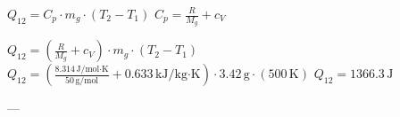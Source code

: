 \( Q_{12} = C_p \cdot m_g \cdot (T_2 - T_1) \)  
\( C_p = \frac{R}{M_g} + c_V \)  

\( Q_{12} = \left( \frac{R}{M_g} + c_V \right) \cdot m_g \cdot (T_2 - T_1) \)  
\( Q_{12} = \left( \frac{8.314 \, \text{J/mol·K}}{50 \, \text{g/mol}} + 0.633 \, \text{kJ/kg·K} \right) \cdot 3.42 \, \text{g} \cdot (500 \, \text{K}) \)  
\( Q_{12} = 1366.3 \, \text{J} \)  

---